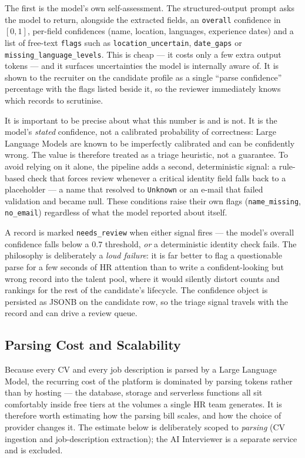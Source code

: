 The first is the model's own self-assessment. The structured-output prompt
asks the model to return, alongside the extracted fields, an
\texttt{overall} confidence in $[0,1]$, per-field confidences (name,
location, languages, experience dates) and a list of free-text
\texttt{flags} such as \texttt{location\_uncertain}, \texttt{date\_gaps} or
\texttt{missing\_language\_levels}. This is cheap --- it costs only a few
extra output tokens --- and it surfaces uncertainties the model is
internally aware of. It is shown to the recruiter on the candidate profile
as a single ``parse confidence'' percentage with the flags listed beside it,
so the reviewer immediately knows which records to scrutinise.

It is important to be precise about what this number is and is not. It is the
model's \emph{stated} confidence, not a calibrated probability of
correctness: Large Language Models are known to be imperfectly calibrated and
can be confidently wrong. The value is therefore treated as a triage
heuristic, not a guarantee. To avoid relying on it alone, the pipeline adds a
second, deterministic signal: a rule-based check that forces review whenever a
critical identity field falls back to a placeholder --- a name that resolved
to \texttt{Unknown} or an e-mail that failed validation and became null.
These conditions raise their own flags (\texttt{name\_missing},
\texttt{no\_email}) regardless of what the model reported about itself.

A record is marked \texttt{needs\_review} when either signal fires --- the
model's overall confidence falls below a $0.7$ threshold, \emph{or} a
deterministic identity check fails. The philosophy is deliberately a
\emph{loud failure}: it is far better to flag a questionable parse for a few
seconds of HR attention than to write a confident-looking but wrong record
into the talent pool, where it would silently distort counts and rankings for
the rest of the candidate's lifecycle. The confidence object is persisted as
JSONB on the candidate row, so the triage signal travels with the record and
can drive a review queue.

\subsection{Parsing Cost and Scalability}
\label{sec:impl-cv-cost}

Because every CV and every job description is parsed by a Large Language
Model, the recurring cost of the platform is dominated by parsing tokens
rather than by hosting --- the database, storage and serverless functions all
sit comfortably inside free tiers at the volumes a single HR team generates.
It is therefore worth estimating how the parsing bill scales, and how the
choice of provider changes it. The estimate below is deliberately scoped to
\emph{parsing} (CV ingestion and job-description extraction); the AI
Interviewer is a separate service and is excluded.

